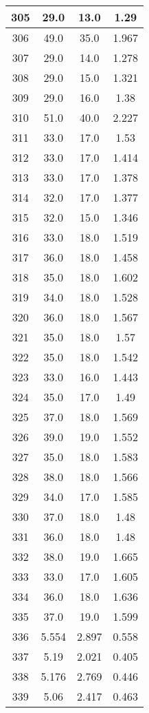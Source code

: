 \begin{table}[H]
\begin{tabular}{|c|c|c|c|}
\hline
305 & 29.0 & 13.0 & 1.29 \\
\hline
306 & 49.0 & 35.0 & 1.967 \\
\hline
307 & 29.0 & 14.0 & 1.278 \\
\hline
308 & 29.0 & 15.0 & 1.321 \\
\hline
309 & 29.0 & 16.0 & 1.38 \\
\hline
310 & 51.0 & 40.0 & 2.227 \\
\hline
311 & 33.0 & 17.0 & 1.53 \\
\hline
312 & 33.0 & 17.0 & 1.414 \\
\hline
313 & 33.0 & 17.0 & 1.378 \\
\hline
314 & 32.0 & 17.0 & 1.377 \\
\hline
315 & 32.0 & 15.0 & 1.346 \\
\hline
316 & 33.0 & 18.0 & 1.519 \\
\hline
317 & 36.0 & 18.0 & 1.458 \\
\hline
318 & 35.0 & 18.0 & 1.602 \\
\hline
319 & 34.0 & 18.0 & 1.528 \\
\hline
320 & 36.0 & 18.0 & 1.567 \\
\hline
321 & 35.0 & 18.0 & 1.57 \\
\hline
322 & 35.0 & 18.0 & 1.542 \\
\hline
323 & 33.0 & 16.0 & 1.443 \\
\hline
324 & 35.0 & 17.0 & 1.49 \\
\hline
325 & 37.0 & 18.0 & 1.569 \\
\hline
326 & 39.0 & 19.0 & 1.552 \\
\hline
327 & 35.0 & 18.0 & 1.583 \\
\hline
328 & 38.0 & 18.0 & 1.566 \\
\hline
329 & 34.0 & 17.0 & 1.585 \\
\hline
330 & 37.0 & 18.0 & 1.48 \\
\hline
331 & 36.0 & 18.0 & 1.48 \\
\hline
332 & 38.0 & 19.0 & 1.665 \\
\hline
333 & 33.0 & 17.0 & 1.605 \\
\hline
334 & 36.0 & 18.0 & 1.636 \\
\hline
335 & 37.0 & 19.0 & 1.599 \\
\hline
336 & 5.554 & 2.897 & 0.558 \\
\hline
337 & 5.19 & 2.021 & 0.405 \\
\hline
338 & 5.176 & 2.769 & 0.446 \\
\hline
339 & 5.06 & 2.417 & 0.463 \\

\end{tabular}
\end{table}
